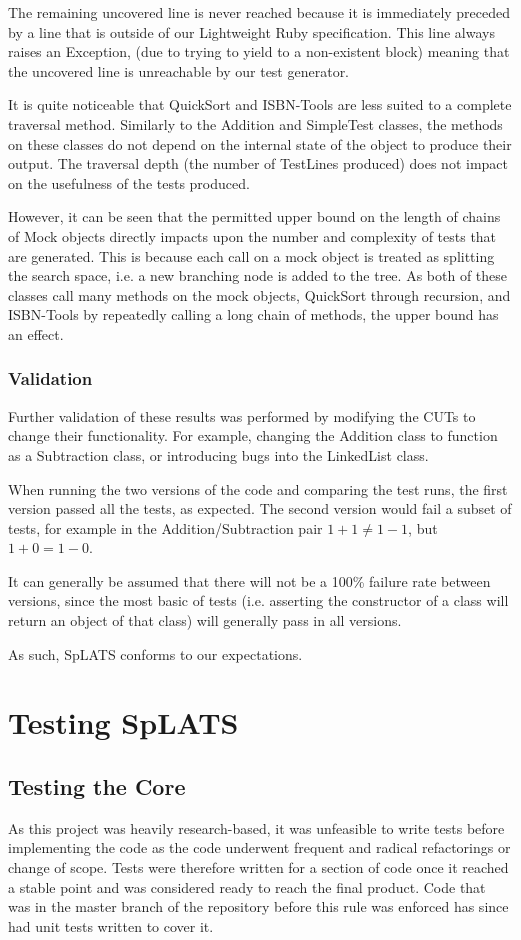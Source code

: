   The remaining uncovered line is never reached because it is immediately preceded by a line that is outside of our Lightweight Ruby specification.
This line always raises an Exception, (due to trying to yield to a non-existent block) meaning that the uncovered line is unreachable by our test generator.

  It is quite noticeable that QuickSort and ISBN-Tools are less suited to a complete traversal method.
Similarly to the Addition and SimpleTest classes, the methods on these classes do not depend on the internal state of the object to produce their output.
The traversal depth (the number of TestLines produced) does not impact on the usefulness of the tests produced.

  However, it can be seen that the permitted upper bound on the length of chains of Mock objects directly impacts upon the number and complexity of tests that are generated.
This is because each call on a mock object is treated as splitting the search space, i.e. a new branching node is added to the tree.
As both of these classes call many methods on the mock objects, QuickSort through recursion, and ISBN-Tools by repeatedly calling a long chain of methods, the upper bound has an effect.

\subsubsection{Validation}
  Further validation of these results was performed by modifying the CUTs to
change their functionality.
For example, changing the Addition class to function as a Subtraction class, or
introducing bugs into the LinkedList class.

When running the two versions of the code and comparing the test runs, the first
version passed all the tests, as expected. The second version would fail a
subset of tests, for example in the Addition/Subtraction pair $1 + 1 \neq 1 -
1$, but $1 + 0 = 1 - 0$.

It can generally be assumed that there will not be a 100\% failure rate between versions, since the most basic of tests (i.e. asserting the constructor of a class will return an object of that class) will generally pass in all versions.

As such, SpLATS conforms to our expectations.

\section{Testing SpLATS}
\subsection{Testing the Core}
  As this project was heavily research-based, it was unfeasible to write tests before implementing the code as the code underwent frequent and radical refactorings or change of scope.
  Tests were therefore written for a section of code once it reached a stable point and was considered ready to reach the final product.
  Code that was in the master branch of the repository before this rule was enforced has since had unit tests written to cover it.
    
